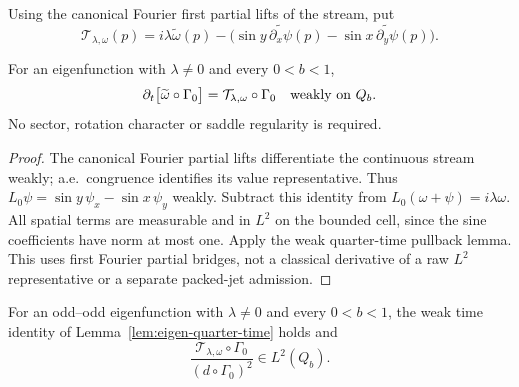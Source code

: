 \begin{definition}
\label{def:vorticity-time-derivative}
\leanok
Using the canonical Fourier first partial lifts of the stream, put
\[
 \mathcal T_{\lambda,\omega}(p)=i\lambda\widetilde\omega(p)
   -\bigl(\sin y\,\widetilde{\partial_x\psi}(p)
          -\sin x\,\widetilde{\partial_y\psi}(p)\bigr).
\]
\end{definition}

\begin{lemma}
\label{lem:eigen-quarter-time}
\leanok
For an eigenfunction with $\lambda\ne0$ and every $0<b<1$,
\[
 \partial_t\bigl[\widetilde\omega\circ\Gamma_0\bigr]
   =\mathcal T_{\lambda,\omega}\circ\Gamma_0
 \quad\hbox{weakly on }Q_b.
\]
No sector, rotation character or saddle regularity is required.
\end{lemma}

\begin{proof}
\leanok
The canonical Fourier partial lifts differentiate the continuous stream
weakly; a.e.\ congruence identifies its value representative.
Thus $L_0\psi=\sin y\,\psi_x-\sin x\,\psi_y$ weakly.
Subtract this identity from $L_0(\omega+\psi)=i\lambda\omega$.
All spatial terms are measurable and in $L^2$ on the bounded cell,
since the sine coefficients have norm at most one.
Apply the weak quarter-time pullback lemma.
This uses first Fourier partial bridges, not a classical derivative
of a raw $L^2$ representative or a separate packed-jet admission.
\end{proof}

\begin{lemma}
\label{lem:dd-quarter-time}
\leanok
For an odd--odd eigenfunction with $\lambda\ne0$ and every $0<b<1$,
the weak time identity of Lemma~\ref{lem:eigen-quarter-time} holds and
\[
 \frac{\mathcal T_{\lambda,\omega}\circ\Gamma_0}
 {(d\circ\Gamma_0)^2}\in L^2(Q_b).
\]
\end{lemma}

